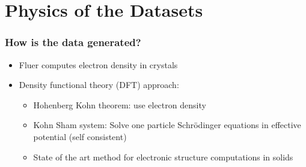 
\section{Physics of the Datasets}


\begin{frame}\frametitle{How is the data generated?}
\begin{itemize}

\item Fluer computes electron density in crystals
\item Density functional theory (DFT) approach:
\begin{itemize}
    \item Hohenberg Kohn theorem: use electron density 
    \item Kohn Sham system: Solve one particle Schrödinger equations in effective potential (self consistent)
    \item State of the art method for electronic structure computations in solids
\end{itemize}
\end{itemize}
\end{frame}

